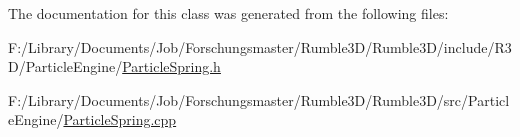 The documentation for this class was generated from the following files\+:\begin{DoxyCompactItemize}
\item 
F\+:/\+Library/\+Documents/\+Job/\+Forschungsmaster/\+Rumble3\+D/\+Rumble3\+D/include/\+R3\+D/\+Particle\+Engine/\hyperlink{_particle_spring_8h}{Particle\+Spring.\+h}\item 
F\+:/\+Library/\+Documents/\+Job/\+Forschungsmaster/\+Rumble3\+D/\+Rumble3\+D/src/\+Particle\+Engine/\hyperlink{_particle_spring_8cpp}{Particle\+Spring.\+cpp}\end{DoxyCompactItemize}
